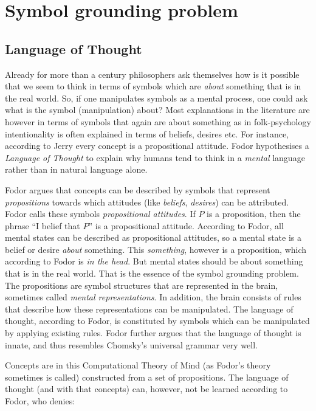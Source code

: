 \section{Symbol grounding problem}

\subsection{Language of Thought}

Already for more than a century philosophers ask themselves how is it possible that we seem to think in terms of symbols which are {\em about} something that is in the real world. So, if one manipulates symbols as a mental process, one could ask what is the symbol (manipulation) about? Most explanations in the literature are however in terms of symbols that again are about something as in folk-psychology intentionality is often explained in terms of beliefs, desires etc. For instance, according to Jerry \citet{fodor:1975} every concept is a propositional attitude. Fodor hypothesises a {\em Language of Thought} to explain why humans tend to think in a {\em mental} language rather than in natural language alone.

Fodor argues that concepts can be described by symbols that represent {\em propositions} towards which attitudes (like {\em beliefs}, {\em desires}) can be attributed. Fodor calls these symbols {\em propositional attitudes}. If $P$ is a proposition, then the phrase ``I belief that $P$'' is a propositional attitude. According to Fodor, all mental states can be described as propositional attitudes, so a mental state is a belief or desire {\em about} something. This {\em something}, however is a proposition, which according to Fodor is {\em in the head}. But mental states should be about something that is in the real world. That is the essence of the symbol grounding problem. The propositions are symbol structures that are represented in the brain, sometimes called {\em mental representations}. In addition, the brain consists of rules that describe how these representations can be manipulated. The language of thought, according to Fodor, is constituted by symbols which can be manipulated by applying existing rules. Fodor further argues that the language of thought is innate, and thus resembles Chomsky's universal grammar very well.

Concepts are in this Computational Theory of Mind (as Fodor's theory sometimes is called) constructed from a set of propositions. The language of thought (and with that concepts) can, however, not be learned according to Fodor, who denies:

